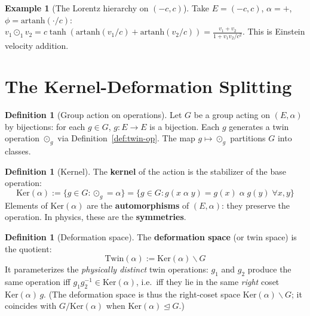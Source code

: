 \documentclass[12pt]{article}
\theoremstyle{plain}
\theoremstyle{definition}
\newtheorem{definition}[theorem]{Definition}
\newtheorem{example}[theorem]{Example}
\theoremstyle{remark}
\newcommand{\Ker}{\mathrm{Ker}}
\newcommand{\Twin}{\mathrm{Twin}}
\begin{document}
\begin{example}[The Lorentz hierarchy on $(-c, c)$]\label{ex:lorentz}
Take $E = (-c, c)$, $\alpha = +$, $\phi = \mathrm{artanh}(\cdot/c)$:
$v_1 \odot_1 v_2 = c\tanh(\mathrm{artanh}(v_1/c) + \mathrm{artanh}(v_2/c)) = \frac{v_1 + v_2}{1 + v_1v_2/c^2}$.
This is Einstein velocity addition.
\end{example}


\section{The Kernel-Deformation Splitting}
\label{sec:kernel}

\begin{definition}[Group action on operations]\label{def:group-action}
Let $G$ be a group acting on $(E, \alpha)$ by bijections: for each $g \in G$, $g: E \to E$ is a bijection. Each $g$ generates a twin operation $\odot_g$ via Definition~\ref{def:twin-op}. The map $g \mapsto \odot_g$ partitions $G$ into classes.
\end{definition}

\begin{definition}[Kernel]\label{def:kernel}
The \textbf{kernel} of the action is the stabilizer of the base operation:
\begin{equation}
\Ker(\alpha) := \{g \in G : \odot_g = \alpha\} = \{g \in G : g(x \;\alpha\; y) = g(x) \;\alpha\; g(y) \;\forall x, y\}
\end{equation}
Elements of $\Ker(\alpha)$ are the \textbf{automorphisms} of $(E, \alpha)$: they preserve the operation. In physics, these are the \textbf{symmetries}.
\end{definition}

\begin{definition}[Deformation space]\label{def:deformation}
The \textbf{deformation space} (or twin space) is the quotient:
\begin{equation}
\Twin(\alpha) := \Ker(\alpha) \backslash G
\end{equation}
It parameterizes the \emph{physically distinct} twin operations: $g_1$ and $g_2$ produce the same operation iff $g_1 g_2^{-1} \in \Ker(\alpha)$, i.e.\ iff they lie in the same \emph{right} coset $\Ker(\alpha)\,g$. (The deformation space is thus the right-coset space $\Ker(\alpha)\backslash G$; it coincides with $G/\Ker(\alpha)$ when $\Ker(\alpha)\trianglelefteq G$.)
\end{definition}
\end{document}
